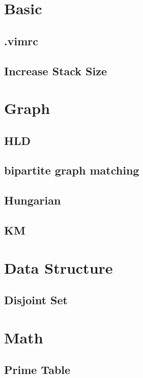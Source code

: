 \documentclass[10pt,twocolumn,oneside]{article}
\begin{document}
\newpage

\section{Basic}
\subsection{.vimrc}


\subsection{Increase Stack Size}



\section{Graph}
\subsection{HLD}

\subsection{bipartite graph matching}
\subsection{Hungarian}

\subsection{KM}


\section{Data Structure}
\subsection{Disjoint Set}


\section{Math}
\subsection{Prime Table}

\end{document}
